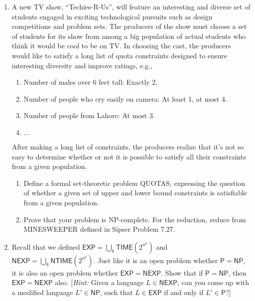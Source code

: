 \documentclass[11pt]{article}
\begin{document}
\begin{enumerate}
\item A new TV show, ``Techies-R-Us'', will feature an interesting and diverse set of students engaged in exciting technological pursuits such as design competitions and problem sets. The producers of the show must choose a set of students for its show from among a big population of actual students who think it would be cool to be on TV. In choosing the cast, the producers would like to satisfy a long list of quota constraints designed to ensure interesting diversity and improve ratings, e.g.,
\begin{enumerate}
\item Number of males over 6 feet tall: Exactly 2.
\item Number of people who cry easily on camera: At least 1, at most 4.
\item Number of people from Lahore: At most 3.
\item  $\ldots$
\end{enumerate}
After making a long list of constraints, the producers realize that it’s not so easy to determine whether or not it is possible to satisfy all their constraints from a given population.
\begin{enumerate}
\item Define a formal set-theoretic problem \textsf{QUOTAS}, expressing the question of whether a given set of upper and lower bound constraints is satisfiable from a given population.

\item Prove that your problem is \textsf{NP}-complete. For the reduction, reduce from \textsf{MINESWEEPER} defined in Sipser Problem 7.27.
\end{enumerate}

\item Recall that we defined $\mathsf{EXP} = \bigcup_k \mathsf{TIME}\left( 2^{n^k}\right)$ and $\mathsf{NEXP} = \bigcup_k \mathsf{NTIME}\left( 2^{n^k}\right)$. Just like it is an open problem whether $\mathsf{P = NP}$, it is also an open problem whether $\mathsf{EXP = NEXP}$. Show that if $\mathsf{P = NP}$, then $\mathsf{EXP = NEXP}$ also. [\emph{Hint:} Given a language $L \in  \mathsf{NEXP}$, can you come up with a modified language
$L' \in \mathsf{NP}$, such that $L \in \mathsf{EXP}$ if and only if $L' \in \mathsf{P}$?]

\end{enumerate}
\end{document}
